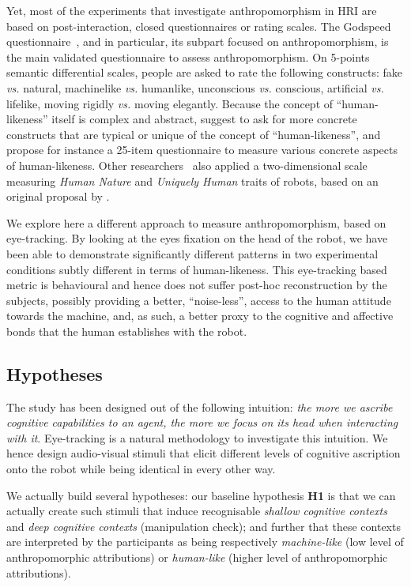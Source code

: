 \documentclass[lettersize, noapacite, twoside, HRI]{apa_HRI}
\newcommand{\vs}{\textit{vs.}\xspace}
\newcommand{\h}[1]{\textbf{H#1}\xspace}
\begin{document}
Yet, most of the experiments that investigate anthropomorphism in HRI are based
on post-interaction, closed questionnaires or rating scales.  The Godspeed
questionnaire~\citep{bartneck_measurement_2008}, and in particular, its subpart
focused on anthropomorphism, is the main validated questionnaire to assess
anthropomorphism. On 5-points semantic differential scales, people are asked to
rate the following constructs: fake \vs natural, machinelike \vs humanlike,
unconscious \vs conscious, artificial \vs lifelike, moving rigidly \vs moving
elegantly. Because the concept of ``human-likeness'' itself is complex and
abstract, \citet{kahn_jr._robotic_2006} suggest to ask for more concrete
constructs that are typical or unique of the concept of ``human-likeness'', and
\citet{ruijten_introducing_2014} propose for instance a 25-item questionnaire to
measure various concrete aspects of human-likeness. Other
researchers~\citep{zlotowski2014dimensions,salem2015would} also applied a
two-dimensional scale measuring \emph{Human Nature} and \emph{Uniquely Human}
traits of robots, based on an original proposal by \citet{haslam2008attributing}.

We explore here a different approach to measure anthropomorphism, based on
eye-tracking.  By looking at the eyes fixation on the head of the robot, we have
been able to demonstrate significantly different patterns in two experimental
conditions subtly different in terms of human-likeness. This eye-tracking based
metric is behavioural and hence does not suffer post-hoc reconstruction by the
subjects, possibly providing a better, ``noise-less'', access to the human
attitude towards the machine, and, as such, a better proxy to the cognitive and
affective bonds that the human establishes with the robot.


\subsection{Hypotheses}

The study has been designed out of the following intuition: \emph{the more we
ascribe cognitive capabilities to an agent, the more we focus on its head when
interacting with it}. Eye-tracking is a natural methodology to investigate
this intuition. We hence design audio-visual stimuli that elicit different
levels of cognitive ascription onto the robot while being identical in every
other way.

We actually build several hypotheses: our baseline hypothesis \h{1} is that we
can actually create such stimuli that induce recognisable \emph{shallow
cognitive contexts} and \emph{deep cognitive contexts} (manipulation check); and
further that these contexts are interpreted by the participants as being
respectively \emph{machine-like} (low level of anthropomorphic attributions) or
\emph{human-like} (higher level of anthropomorphic attributions).
\end{document}
